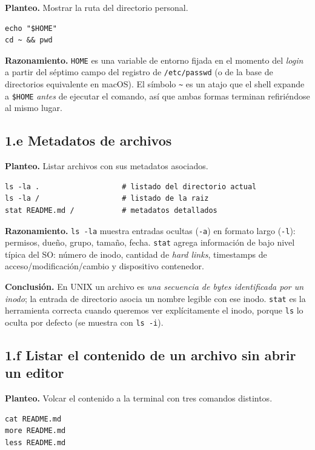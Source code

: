 \documentclass[11pt,a4paper]{article}
\begin{document}
\textbf{Planteo.} Mostrar la ruta del directorio personal.

\begin{lstlisting}
echo "$HOME"
cd ~ && pwd
\end{lstlisting}

\textbf{Razonamiento.} \texttt{HOME} es una variable de entorno fijada
en el momento del \emph{login} a partir del séptimo campo del registro
de \texttt{/etc/passwd} (o de la base de directorios equivalente en
macOS). El símbolo \texttt{\~{}} es un atajo que el shell expande a
\texttt{\$HOME} \emph{antes} de ejecutar el comando, así que ambas
formas terminan refiriéndose al mismo lugar.

\subsection*{1.e Metadatos de archivos}

\textbf{Planteo.} Listar archivos con sus metadatos asociados.

\begin{lstlisting}
ls -la .                   # listado del directorio actual
ls -la /                   # listado de la raiz
stat README.md /           # metadatos detallados
\end{lstlisting}

\textbf{Razonamiento.} \texttt{ls -la} muestra entradas ocultas
(\texttt{-a}) en formato largo (\texttt{-l}): permisos, dueño, grupo,
tamaño, fecha. \texttt{stat} agrega información de bajo nivel típica
del SO: número de inodo, cantidad de \emph{hard links}, timestamps de
acceso/modificación/cambio y dispositivo contenedor.

\textbf{Conclusión.} En UNIX un archivo es \emph{una secuencia de
bytes identificada por un inodo}; la entrada de directorio asocia un
nombre legible con ese inodo. \texttt{stat} es la herramienta correcta
cuando queremos ver explícitamente el inodo, porque \texttt{ls} lo
oculta por defecto (se muestra con \texttt{ls -i}).

\subsection*{1.f Listar el contenido de un archivo sin abrir un editor}

\textbf{Planteo.} Volcar el contenido a la terminal con tres comandos
distintos.

\begin{lstlisting}
cat README.md
more README.md
less README.md
\end{lstlisting}
\end{document}
